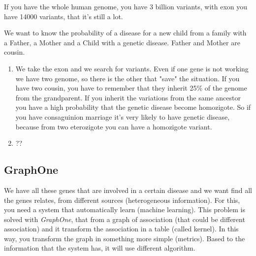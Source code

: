 If you have the whole human genome, you have 3 billion variants, with exon you
have 14000 variants, that it's still a lot.

We want to know the probability of a disease for a new child from a family with
a Father, a Mother and a Child with a genetic disease. Father and Mother are
cousin.
\begin{enumerate}
	\item We take the exon and we search for variants. Even if one gene is not
	working we have two genome, so there is the other that "save" the situation.
	If you have two cousin, you have to remember that they inherit 25\% of the
	genome from the grandparent. If you inherit the variations from the same
	ancestor you have a high probability that the genetic disease become
	homozigote. So if you have consaguinion marriage it's very likely to have
	genetic disease, because from two eterozigote you can have a homozigote
	variant.
	\item ?? %
\end{enumerate}

\subsection{GraphOne}
We have all these genes that are involved in a certain disease and we want find
all the genes relates, from different sources (heterogeneous information). For
this, you need a system that automatically learn (machine learning). This
problem is solved with \textit{GraphOne}, that from a graph of association
(that could be different association) and it transform the association in a
table (called kernel). In this way, you transform the graph in something more
simple (metrics).
Based to the information that the system has, it will use different algorithm.


